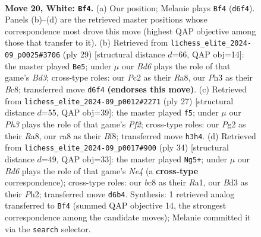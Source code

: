 \documentclass[11pt]{article}
\begin{document}
\clearpage

\begin{figure}[p]\centering
\begin{subfigure}{0.46\textwidth}\centering
\resizebox{\linewidth}{!}{%
\newchessgame
\chessboard[
  setfen={r1b1k1nr/p3b1pp/2pB4/5p2/2N5/3B1P1P/PPP3P1/R2R2K1 w - - 1 20},
  showmover=false,
  pgfstyle=straightmove, color=movearrow, markmove={d6-f4}
]}
\caption{}
\end{subfigure}\hfill
\begin{subfigure}{0.46\textwidth}\centering
\resizebox{\linewidth}{!}{%
\newchessgame
\chessboard[
  setfen={r1b1k2r/1p3ppp/p2b1n2/8/P1BR4/2N5/1P3PPP/R1B3K1 b kq - 0 15},
  showmover=false,
  pgfstyle=straightmove, color=movearrow, markmove={d6-e5}
]}
\caption{}
\end{subfigure}
\\[4pt]
\begin{subfigure}{0.46\textwidth}\centering
\resizebox{\linewidth}{!}{%
\newchessgame
\chessboard[
  setfen={r3kb1r/pp3ppp/2n5/2P5/1P4b1/N1P2p1B/P4P2/R1BK3R b kq - 1 14},
  showmover=false,
  pgfstyle=straightmove, color=movearrow, markmove={f7-f5}
]}
\caption{}
\end{subfigure}\hfill
\begin{subfigure}{0.46\textwidth}\centering
\resizebox{\linewidth}{!}{%
\newchessgame
\chessboard[
  setfen={r4b1r/pp3kpp/1npB4/5p2/3PN3/2P2K2/PP4PP/R3R3 w - - 0 18},
  showmover=false,
  pgfstyle=straightmove, color=movearrow, markmove={e4-g5}
]}
\caption{}
\end{subfigure}
\caption{\textbf{Move 20, White: \texttt{Bf4}.} (a) Our position; Melanie plays \texttt{Bf4} (\texttt{d6f4}). Panels (b)--(d) are the retrieved master positions whose correspondence most drove this move (highest QAP objective among those that transfer to it). (b) Retrieved from \texttt{lichess\_elite\_2024-09\_p0025\#3706} (ply 29) [structural distance $d$=66, QAP obj=14]: the master played \texttt{Be5}; under $\mu$ our \emph{Bd6} plays the role of that game's \emph{Bd3}; cross-type roles: our \emph{P}c2 as their \emph{R}a8, our \emph{P}h3 as their \emph{B}c8; transferred move \texttt{d6f4} \textbf{(endorses this move)}. (c) Retrieved from \texttt{lichess\_elite\_2024-09\_p0012\#2271} (ply 27) [structural distance $d$=55, QAP obj=39]: the master played \texttt{f5}; under $\mu$ our \emph{Ph3} plays the role of that game's \emph{Pf2}; cross-type roles: our \emph{P}g2 as their \emph{R}a8, our \emph{r}a8 as their \emph{B}f8; transferred move \texttt{h3h4}. (d) Retrieved from \texttt{lichess\_elite\_2024-09\_p0017\#900} (ply 34) [structural distance $d$=49, QAP obj=33]: the master played \texttt{Ng5+}; under $\mu$ our \emph{Bd6} plays the role of that game's \emph{Ne4} (a \textbf{cross-type} correspondence); cross-type roles: our \emph{b}c8 as their \emph{R}a1, our \emph{B}d3 as their \emph{P}h2; transferred move \texttt{d6b4}. Synthesis: 1 retrieved analog transferred to \texttt{Bf4} (summed QAP objective 14, the strongest correspondence among the candidate moves); Melanie committed it via the \texttt{search} selector.}
\label{fig:thought-m38}
\end{figure}
\end{document}
